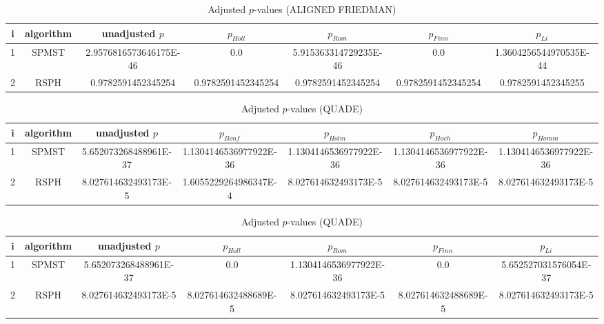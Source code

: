 \documentclass[a4paper,10pt]{article}
\begin{document}
\begin{landscape}
\begin{table}[!htp]
\centering\scriptsize
\caption{Adjusted $p$-values (ALIGNED FRIEDMAN)}
\begin{tabular}{ccccccc}
i&algorithm&unadjusted $p$&$p_{Holl}$&$p_{Rom}$&$p_{Finn}$&$p_{Li}$\\
\hline
1&SPMST&2.9576816573646175E-46&0.0&5.915363314729235E-46&0.0&1.3604256544970535E-44\\
2&RSPH&0.9782591452345254&0.9782591452345254&0.9782591452345254&0.9782591452345254&0.9782591452345255\\
\hline
\end{tabular}
\end{table}


\newpage

\begin{table}[!htp]
\centering\scriptsize
\caption{Adjusted $p$-values (QUADE)}
\begin{tabular}{ccccccc}
i&algorithm&unadjusted $p$&$p_{Bonf}$&$p_{Holm}$&$p_{Hoch}$&$p_{Homm}$\\
\hline
1&SPMST&5.652073268488961E-37&1.1304146536977922E-36&1.1304146536977922E-36&1.1304146536977922E-36&1.1304146536977922E-36\\
2&RSPH&8.027614632493173E-5&1.6055229264986347E-4&8.027614632493173E-5&8.027614632493173E-5&8.027614632493173E-5\\
\hline
\end{tabular}
\end{table}

\begin{table}[!htp]
\centering\scriptsize
\caption{Adjusted $p$-values (QUADE)}
\begin{tabular}{ccccccc}
i&algorithm&unadjusted $p$&$p_{Holl}$&$p_{Rom}$&$p_{Finn}$&$p_{Li}$\\
\hline
1&SPMST&5.652073268488961E-37&0.0&1.1304146536977922E-36&0.0&5.652527031576054E-37\\
2&RSPH&8.027614632493173E-5&8.027614632488689E-5&8.027614632493173E-5&8.027614632488689E-5&8.027614632493173E-5\\
\hline
\end{tabular}
\end{table}

\end{landscape}
\end{document}
